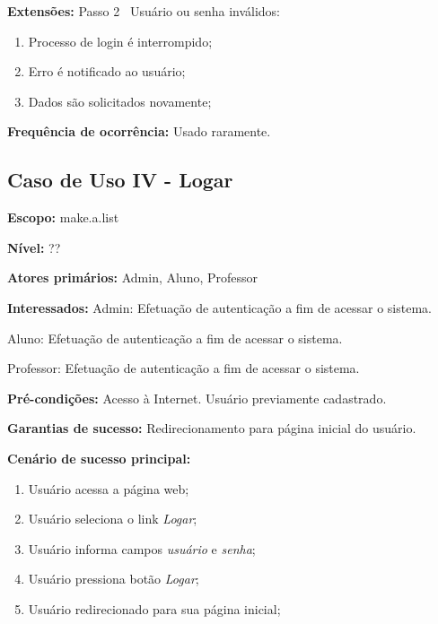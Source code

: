 \documentclass[12pt,oneside,a4paper,article]{abntex2}
\begin{document}
		\textbf{Extensões:} Passo 2 \textrightarrow \ Usuário ou senha inválidos:
		
		\begin{enumerate}[label=\alph*.]	
			\item Processo de login é interrompido;
			\item Erro é notificado ao usuário;
			\item Dados são solicitados novamente;	
			
		\end{enumerate}
		
		\textbf{Frequência de ocorrência:} Usado raramente.
		
		\subsection{Caso de Uso IV - Logar}
		
		\textbf{Escopo:} make.a.list 
		
		\textbf{Nível:} ??
		
		\textbf{Atores primários:} Admin, Aluno, Professor
		
		\textbf{Interessados:} Admin: Efetuação de autenticação a fim de acessar o sistema. 
		
		Aluno: Efetuação de autenticação a fim de acessar o sistema.
		
		Professor: Efetuação de autenticação a fim de acessar o sistema.
		
		\textbf{Pré-condições:} Acesso à Internet. Usuário previamente cadastrado.
		
		\textbf{Garantias de sucesso:} Redirecionamento para página inicial do usuário.
		
		\textbf{Cenário de sucesso principal:}
		
		\begin{enumerate}
			\item Usuário acessa a página web;
			
			\item Usuário seleciona o link \textit{Logar};
			
			\item Usuário informa campos \textit{usuário} e \textit{senha};
			
			\item Usuário pressiona botão \textit{Logar};
			
			\item Usuário redirecionado para sua página inicial;
			
		\end{enumerate}
		
\end{document}
